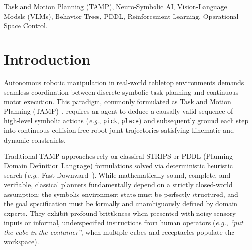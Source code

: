 \documentclass[conference]{IEEEtran}
\begin{document}
\begin{IEEEkeywords}
Task and Motion Planning (TAMP), Neuro-Symbolic AI, Vision-Language Models (VLMs), Behavior Trees, PDDL, Reinforcement Learning, Operational Space Control.
\end{IEEEkeywords}

\section{Introduction}
\label{sec:introduction}

Autonomous robotic manipulation in real-world tabletop environments demands seamless coordination between discrete symbolic task planning and continuous motor execution. This paradigm, commonly formulated as Task and Motion Planning (TAMP)~\cite{chisari2025robotic, liu2023llmp}, requires an agent to deduce a causally valid sequence of high-level symbolic actions (\textit{e.g.}, \texttt{pick}, \texttt{place}) and subsequently ground each step into continuous collision-free robot joint trajectories satisfying kinematic and dynamic constraints.

Traditional TAMP approaches rely on classical STRIPS or PDDL (Planning Domain Definition Language) formulations solved via deterministic heuristic search (\textit{e.g.}, Fast Downward~\cite{helmert2006fast}). While mathematically sound, complete, and verifiable, classical planners fundamentally depend on a strictly closed-world assumption: the symbolic environment state must be perfectly structured, and the goal specification must be formally and unambiguously defined by domain experts. They exhibit profound brittleness when presented with noisy sensory inputs or informal, underspecified instructions from human operators (\textit{e.g.}, \textit{``put the cube in the container''}, when multiple cubes and receptacles populate the workspace).
\end{document}
